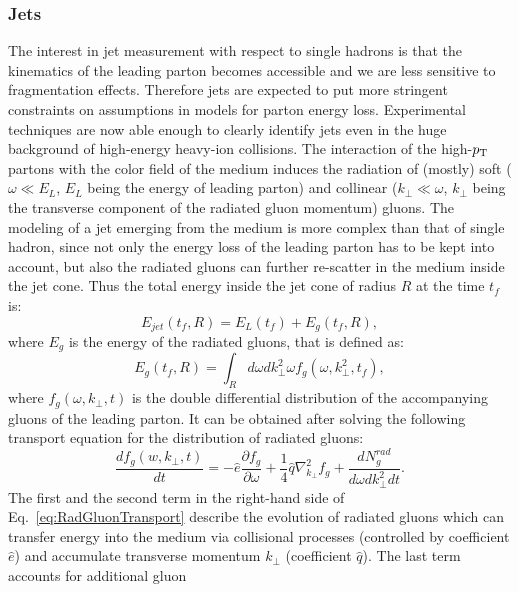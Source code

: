 \subsubsection{Jets}
The interest in jet measurement with respect to single hadrons is that
the kinematics of the leading parton becomes accessible and we are 
less sensitive to fragmentation effects. Therefore jets are expected to put 
more stringent constraints on assumptions in models for parton energy loss. 
Experimental techniques are now able enough to clearly identify jets 
even in the huge background of high-energy heavy-ion collisions. 
The interaction of the high-$p_{\rm T}$ partons with the color field of the medium
 induces the radiation of (mostly) soft ($\omega \ll E_{L}$, $E_L$ being the 
 energy of leading parton) and collinear ($k_{\perp} \ll \omega$, $k_{\perp}$ being
 the transverse component of the radiated gluon momentum) gluons. The 
 modeling of a jet emerging from the medium is more complex than that of
  single hadron, since not only the energy loss of the leading parton has to be 
  kept into account, but also the radiated gluons can further re-scatter in the 
  medium inside the jet cone. Thus the total energy inside the jet cone 
  of radius $R$ at the time $t_f$ is:
\begin{equation}
\label{eq:EnergyJet}
E_{jet}(t_f,R) = E_L(t_f) +E_g(t_f,R),
\end{equation}
where $E_g$ is the energy of the radiated gluons, that is defined as:
\begin{equation}
\label{eq:Eg}
E_g(t_f,R) = \int_R d\omega dk^2_\perp \omega f_g(\omega,k^2_\perp,t_f),
\end{equation}
where $f_g(\omega,k_{\perp},t)$ is the double differential distribution of 
the accompanying gluons of the leading parton. It can be obtained after solving 
the following transport equation for the distribution of radiated gluons:
\begin{equation}
\label{eq:RadGluonTransport}
\frac{df_g(w,k_{\perp},t)}{dt} = -\hat{e}\frac{\partial f_g}{\partial \omega} + \frac{1}{4}\hat{q}\nabla^2_{k_{\perp}}f_g + \frac{dN^{rad}_g}{d\omega dk^2_{\perp} dt}.
\end{equation}
The first and the second term in the right-hand side of Eq.~\ref{eq:RadGluonTransport} 
describe the evolution of radiated gluons which can transfer energy 
into the medium via collisional processes (controlled by coefficient 
$\hat{e}$) and accumulate transverse momentum $k_\perp$ 
(coefficient $\hat{q}$). The last term accounts for additional gluon 

